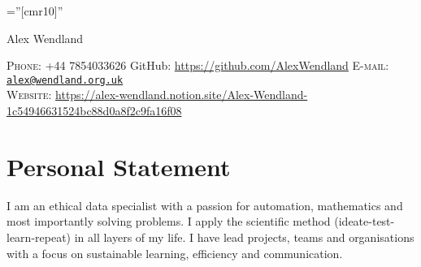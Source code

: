 \documentclass[a4paper,10pt]{article}
\begin{document}
\pagestyle{empty} %

\font\fb=''[cmr10]'' %

\par{\centering
		{\Huge Alex Wendland
	}\bigskip\par}
\vspace{-0.3 cm}
\begin{center}
	\textsc{Phone:} +44 7854033626 \hspace{1cm} GitHub: \href{https://github.com/AlexWendland}{https://github.com/AlexWendland} \hspace{1cm} \textsc{E-mail:} \href{mailto:alex@wendland.org.uk}{\texttt{alex@wendland.org.uk}}\\
	\textsc{Website:} \href{https://alex-wendland.notion.site/Alex-Wendland-1c54946631524bc88d0a8f2c9fa16f08}{https://alex-wendland.notion.site/Alex-Wendland-1c54946631524bc88d0a8f2c9fa16f08}
\end{center}

\section{Personal Statement}
I am an ethical data specialist with a passion for automation, mathematics and most importantly solving problems. I apply the scientific method (ideate-test-learn-repeat) in all layers of my life. I have lead projects, teams and organisations with a focus on sustainable learning, efficiency and communication.
\end{document}

